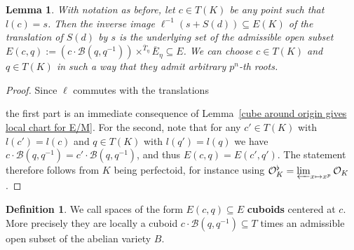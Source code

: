 \documentclass[10pt,oneside]{amsart}
\newtheorem{lemma}[theorem]{Lemma}
\theoremstyle{definition}
\newtheorem{definition}[theorem]{Definition}
\begin{document}
	\begin{lemma}\label{cube around point gives local chart for E/M}
		With notation as before, let $c \in T(K)$ be any point such that $l(c)=s$. Then the inverse image $\ell^{-1}(s+S(d))\subseteq E(K)$ of the translation of $S(d)$ by $s$ is the underlying set of the admissible open subset $E(c,q) := (c\cdot \mathcal B(q,q^{-1}))\times^{\overline{T}_\eta}\overline{E}_\eta \subseteq E$. We can choose $c\in T(K)$ and $q\in T(K)$ in such a way that they admit arbitrary $p^n$-th roots.
	\end{lemma}
	
	\begin{proof}
		Since $\ell$ commutes with the translations
		\begin{center}
		\end{center}
		the first part is an immediate consequence of Lemma~\ref{cube around origin gives local chart for E/M}. For the second, note that for any $c'\in T(K)$ with $l(c')=l(c)$ and $q\in T(K)$ with $l(q')=l(q)$ we have $c\cdot \mathcal B(q,q^{-1}) = c'\cdot \mathcal B(q,q^{-1})$, and thus $E(c,q)=E(c',q')$. The statement therefore follows from $K$ being perfectoid, for instance using $\mathcal O_K^\flat = \varprojlim_{x\mapsto x^p}\mathcal O_K$.
	\end{proof}
    
    \begin{definition}\label{defininition of cuboid}
		We call spaces of the form $E(c,q)\subseteq E$ \textbf{cuboids} centered at $c$. More precisely they are locally a cuboid   $c\cdot\mathcal B(q,q^{-1})\subseteq T$ times an admissible open subset of the abelian variety $B$. 
	\end{definition}
    
\end{document}
